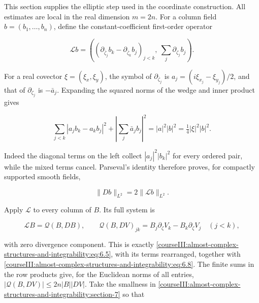 \label{courseIII:almost-complex-structures-and-integrability:section-8}

This section supplies the elliptic step used in the coordinate construction. All estimates are local in the real dimension \(m=2n\). For a column field \(b=(b_1,\ldots,b_n)\), define the constant-coefficient first-order operator

\begin{equation}
\mathcal Lb=
\left((\partial_{\bar\zeta_j}b_k-\partial_{\bar\zeta_k}b_j)_{j<k},
\ \sum_j\partial_{\zeta_j}b_j\right).
\label{courseIII:almost-complex-structures-and-integrability:eq:8.1}
\end{equation}

For a real covector \(\xi=(\xi_x,\xi_y)\), the symbol of \(\partial_{\bar\zeta_j}\) is \(a_j=(i\xi_{x_j}-\xi_{y_j})/2\), and that of \(\partial_{\zeta_j}\) is \(-\bar a_j\). Expanding the squared norms of the wedge and inner product gives

\begin{equation}
\sum_{j<k}|a_jb_k-a_kb_j|^2
+\left|\sum_j\bar a_jb_j\right|^2
=|a|^2|b|^2=\tfrac14|\xi|^2|b|^2.
\label{courseIII:almost-complex-structures-and-integrability:eq:8.2}
\end{equation}

Indeed the diagonal terms on the left collect \(|a_j|^2|b_k|^2\) for every ordered pair, while the mixed terms cancel. Parseval's identity therefore proves, for compactly supported smooth fields,

\begin{equation}
\|Db\|_{L^2}=2\|\mathcal Lb\|_{L^2}.
\label{courseIII:almost-complex-structures-and-integrability:eq:8.3}
\end{equation}

Apply \(\mathcal L\) to every column of \(B\). Its full system is

\begin{equation}
\mathcal LB=\mathcal Q(B,DB),
\qquad
\mathcal Q(B,DV)_{jk}=B_j\partial_\zeta V_k-B_k\partial_\zeta V_j
\quad(j<k),
\label{courseIII:almost-complex-structures-and-integrability:eq:8.4}
\end{equation}

with zero divergence component. This is exactly \eqref{courseIII:almost-complex-structures-and-integrability:eq:6.5}, with its terms rearranged, together with \eqref{courseIII:almost-complex-structures-and-integrability:eq:6.8}. The finite sums in the row products give, for the Euclidean norms of all entries,
\(|\mathcal Q(B,DV)|\leq2n|B||DV|\).
Take the smallness in \cref{courseIII:almost-complex-structures-and-integrability:section-7} so that

